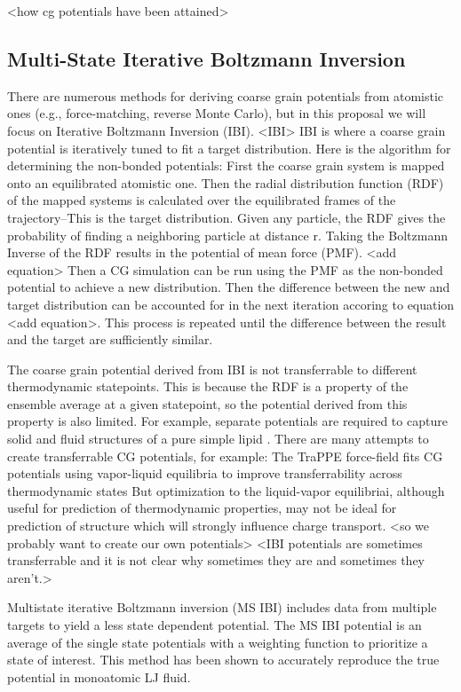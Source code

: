 <how cg potentials have been attained>
\subsection*{Multi-State Iterative Boltzmann Inversion}

There are numerous methods for deriving coarse grain potentials from atomistic ones (e.g., force-matching, reverse Monte Carlo), but in this proposal we will focus on Iterative Boltzmann Inversion (IBI).
<IBI>
IBI is where a coarse grain potential is iteratively tuned to fit a target distribution. \cite{Reith2003a}
Here is the algorithm for determining the non-bonded potentials:
First the coarse grain system is mapped onto an equilibrated atomistic one.
Then the radial distribution function (RDF) of the mapped systems is calculated over the equilibrated frames of the trajectory--This is the target distribution.
Given any particle, the RDF gives the probability of finding a neighboring particle at distance r.
Taking the Boltzmann Inverse of the RDF results in the potential of mean force (PMF). <add equation>
Then a CG simulation can be run using the PMF as the non-bonded potential to achieve a new distribution.
Then the difference between the new and target distribution can be accounted for in the next iteration accoring to equation <add equation>.
This process is repeated until the difference between the result and the target are sufficiently similar.

The coarse grain potential derived from IBI is not transferrable to different thermodynamic statepoints.
This is because the RDF is a property of the ensemble average at a given statepoint, so the potential derived from this property is also limited.
For example, separate potentials are required to capture solid and fluid structures of a pure simple lipid \cite{Hadley2010a}.
There are many attempts to create transferrable CG potentials, for example:
The TraPPE force-field fits CG potentials using vapor-liquid equilibria to improve transferrability across thermodynamic states\cite{Maerzke2011}
But optimization to the liquid-vapor equilibriai, although useful for prediction of thermodynamic properties, may not be ideal for prediction of structure which will strongly influence charge transport.
<so we probably want to create our own potentials>
<IBI potentials are sometimes transferrable and it is not clear why sometimes they are and sometimes they aren't.> \cite{Moore2014}

Multistate iterative Boltzmann inversion (MS IBI) includes data from multiple targets to yield a less state dependent potential.
\cite{Moore2014}
The MS IBI potential is an average of the single state potentials with a weighting function to prioritize a state of interest.
This method has been shown to accurately reproduce the true potential in monoatomic LJ fluid.

